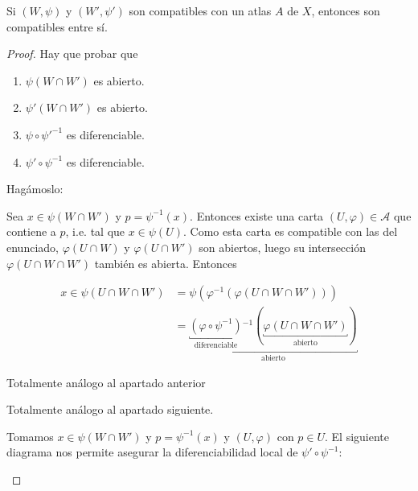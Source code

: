\documentclass[../VD.tex]{subfiles}
\begin{document}
\begin{lemma}
  \label{lem:compat-trans-atlas}
  Si \((W, \psi)\) y \((W', \psi')\) son compatibles con un atlas \(A\) de
  \(X\), entonces son compatibles entre sí.
\end{lemma}

\begin{proof}
  Hay que probar que
  \begin{enumerate}
  \item \(\psi(W \cap W')\) es abierto.
  \item \(\psi'(W \cap W')\) es abierto.
  \item \(\psi \circ \psi'^{-1}\) es diferenciable.
  \item \(\psi' \circ \psi^{-1}\) es diferenciable.
  \end{enumerate}

  Hagámoslo:

  \begin{subproof}
    Sea \(x \in \psi(W \cap W')\) y \(p = \psi^{-1}(x)\).
    Entonces existe una carta \((U,\varphi) \in \mathcal{A}\) que contiene a
    \(p\), i.e. tal que \(x \in \psi(U)\). Como esta carta es compatible con las
    del enunciado, \(\varphi(U \cap W)\) y \(\varphi(U \cap W')\) son abiertos,
    luego su intersección \(\varphi(U \cap W \cap W')\) también es abierta.
    Entonces

    \begin{align*}
      x \in \psi(U \cap W \cap W')
      &= \psi(\varphi^{-1}(\varphi(U \cap W \cap W')))\\
      &= \underbracket{\underbracket{(\varphi \circ \psi^{-1})}_{\text{diferenciable}}{}^{-1} (
        \underbracket{\varphi(U \cap W \cap W')}_{\text{abierto}}
        )}_{\text{abierto}}
    \end{align*}
  \end{subproof}

  \begin{subproof}
    Totalmente análogo al apartado anterior
  \end{subproof}

  \begin{subproof}
    Totalmente análogo al apartado siguiente.
  \end{subproof}

  \begin{subproof}
    Tomamos \(x \in \psi(W \cap W')\) y \(p = \psi^{-1}(x)\) y \((U,\varphi)\)
    con \(p \in U\). El siguiente diagrama nos permite asegurar la
    diferenciabilidad local de \(\psi' \circ \psi^{-1}\):


\end{subproof}
\end{proof}
\end{document}
